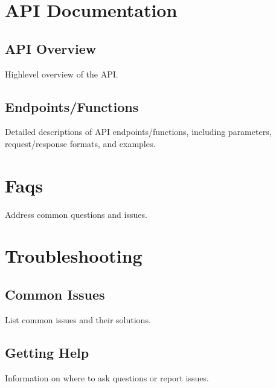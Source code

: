\documentclass[letterpaper,10pt,english]{sphinxmanual}
\begin{document}
\chapter{API Documentation}
\label{\detokenize{api_documentation:api-documentation}}\label{\detokenize{api_documentation::doc}}

\section{API Overview}
\label{\detokenize{api_documentation:api-overview}}
\sphinxAtStartPar
High\sphinxhyphen{}level overview of the API.


\section{Endpoints/Functions}
\label{\detokenize{api_documentation:endpoints-functions}}
\sphinxAtStartPar
Detailed descriptions of API endpoints/functions, including parameters, request/response formats, and examples.

\sphinxstepscope


\chapter{Faqs}
\label{\detokenize{faqs:faqs}}\label{\detokenize{faqs::doc}}
\sphinxAtStartPar
Address common questions and issues.

\sphinxstepscope


\chapter{Troubleshooting}
\label{\detokenize{troubleshooting:troubleshooting}}\label{\detokenize{troubleshooting::doc}}

\section{Common Issues}
\label{\detokenize{troubleshooting:common-issues}}
\sphinxAtStartPar
List common issues and their solutions.


\section{Getting Help}
\label{\detokenize{troubleshooting:getting-help}}
\sphinxAtStartPar
Information on where to ask questions or report issues.

\sphinxstepscope
\end{document}
